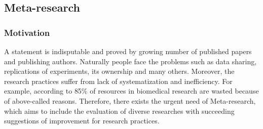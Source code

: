 	\subsection{Meta-research}
		\subsubsection{Motivation}
		A statement \frqq is indisputable and proved by growing number of published papers and publishing authors\cite{Ioa14}. Naturally people face the problems such as data sharing, replications of experiments, its ownership and many others. Moreover, the research practices suffer from lack of systematization and inefficiency. For example, according to \cite{Mac14}  85\% of resources in biomedical research are wasted because of above-called reasons. Therefore, there exists the urgent need of Meta-research, which aims to include the evaluation of diverse researches with succeeding suggestions of improvement for research practices.    
		
		 
